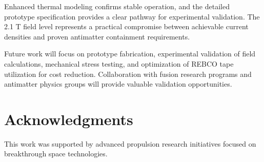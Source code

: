 \documentclass[12pt,a4paper]{article}
\begin{document}
Enhanced thermal modeling confirms stable operation, and the detailed prototype specification provides a clear pathway for experimental validation. The 2.1 T field level represents a practical compromise between achievable current densities and proven antimatter containment requirements.

Future work will focus on prototype fabrication, experimental validation of field calculations, mechanical stress testing, and optimization of REBCO tape utilization for cost reduction. Collaboration with fusion research programs and antimatter physics groups will provide valuable validation opportunities.

\section{Acknowledgments}

This work was supported by advanced propulsion research initiatives focused on breakthrough space technologies.
\end{document}
